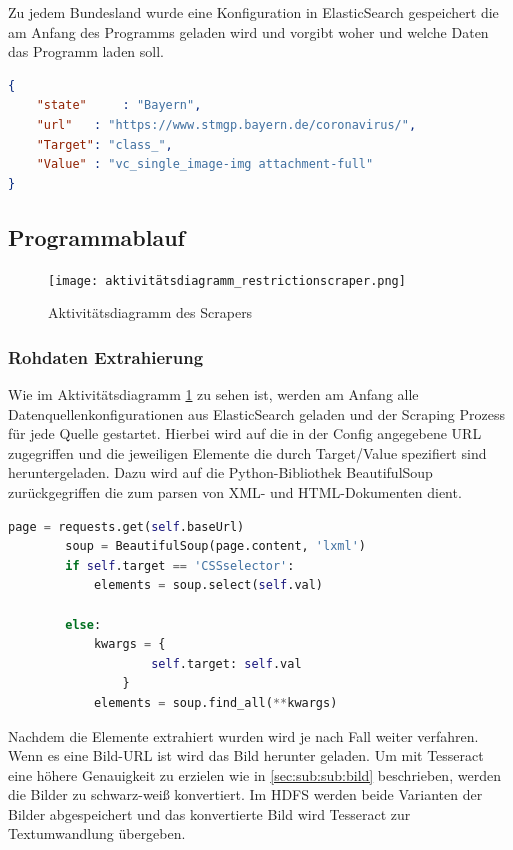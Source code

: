 \documentclass[12pt,oneside,a4paper,parskip]{scrbook}
\begin{document}
Zu jedem Bundesland wurde eine Konfiguration in ElasticSearch gespeichert die am Anfang des Programms geladen wird und vorgibt woher und welche Daten das Programm laden soll.

\begin{lstlisting}[caption=Config von Bayern, language=json]
{
	"state" 	: "Bayern",
	"url"	: "https://www.stmgp.bayern.de/coronavirus/",
	"Target": "class_",
	"Value"	: "vc_single_image-img attachment-full"
}
\end{lstlisting}

\subsection{Programmablauf}

\begin{figure}[H]
\caption{Aktivitätsdiagramm des Scrapers}
\label{activityRestriction}
\centering
\texttt{[image: aktivitätsdiagramm\_restrictionscraper.png]}
\end{figure}

\subsubsection{Rohdaten Extrahierung}\label{sec:sub:sub:rohdaten}

Wie im Aktivitätsdiagramm \cref{activityRestriction} zu sehen ist, werden am Anfang alle Datenquellenkonfigurationen aus ElasticSearch geladen und der Scraping Prozess für jede Quelle gestartet. Hierbei wird auf die in der Config angegebene URL zugegriffen und die jeweiligen Elemente die durch Target/Value spezifiert sind heruntergeladen. Dazu wird auf die Python-Bibliothek BeautifulSoup zurückgegriffen die zum parsen von XML- und HTML-Dokumenten dient.

\begin{lstlisting}[caption=Parsen und filtern der Website, language=Python]
	    page = requests.get(self.baseUrl)
        soup = BeautifulSoup(page.content, 'lxml')
        if self.target == 'CSSselector':
            elements = soup.select(self.val)

        else:
            kwargs = {
                    self.target: self.val
                }
            elements = soup.find_all(**kwargs)
\end{lstlisting}

Nachdem die Elemente extrahiert wurden wird je nach Fall weiter verfahren. Wenn es eine Bild-URL ist wird das Bild herunter geladen. Um mit Tesseract eine höhere Genauigkeit zu erzielen wie in \cref{sec:sub:sub:bild} beschrieben, werden die Bilder zu schwarz-weiß konvertiert. Im HDFS werden beide Varianten der Bilder abgespeichert und das konvertierte Bild wird Tesseract zur Textumwandlung übergeben.
\end{document}
